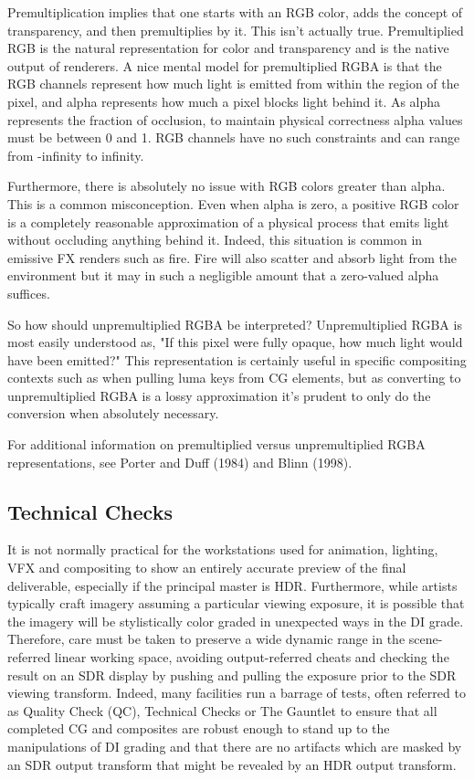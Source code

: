 Premultiplication implies that one starts with an RGB color, adds the concept of transparency, and then premultiplies by it. This isn't actually true. Premultiplied RGB is the natural representation for color and transparency and is the native output of renderers. A nice mental model for premultiplied RGBA is that the RGB channels represent how much light is emitted from within the region of the pixel, and alpha represents how much a pixel blocks light behind it. As alpha represents the fraction of occlusion, to maintain physical correctness alpha values must be between 0 and 1. RGB channels have no such constraints and can range from -infinity to infinity.

Furthermore, there is absolutely no issue with RGB colors greater than alpha. This is a common misconception. Even when alpha is zero, a positive RGB color is a completely reasonable approximation of a physical process that emits light without occluding anything behind it. Indeed, this situation is common in emissive FX renders such as fire. Fire will also scatter and absorb light from the environment but it may in such a negligible amount that a zero-valued alpha suffices.

So how should unpremultiplied RGBA be interpreted? Unpremultiplied RGBA is most easily understood as, "If this pixel were fully opaque, how much light would have been emitted?" This representation is certainly useful in specific compositing contexts such as when pulling luma keys from CG elements, but as converting to unpremultiplied RGBA is a lossy approximation it's prudent to only do the conversion when absolutely necessary.

For additional information on premultiplied versus unpremultiplied RGBA representations, see Porter and Duff (1984) and Blinn (1998).

\subsection{Technical Checks}%
\label{subsec:technical-checks}

It is not normally practical for the workstations used for animation, lighting, VFX and compositing to show an entirely accurate preview of the final deliverable, especially if the principal master is HDR. Furthermore, while artists typically craft imagery assuming a particular viewing exposure, it is possible that the imagery will be stylistically color graded in unexpected ways in the DI grade. Therefore, care must be taken to preserve a wide dynamic range in the scene-referred linear working space, avoiding output-referred cheats and checking the result on an SDR display by pushing and pulling the exposure prior to the SDR viewing transform. Indeed, many facilities run a barrage of tests, often referred to as Quality Check (QC), Technical Checks or The Gauntlet to ensure that all completed CG and composites are robust enough to stand up to the manipulations of DI grading and that there are no artifacts which are masked by an SDR output transform that might be revealed by an HDR output transform.

